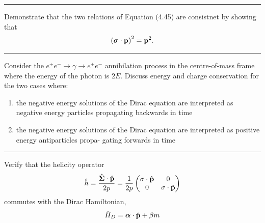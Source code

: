 \noindent\rule{7in}{1.5pt}


\begin{problem}{4.10}
Demonstrate that the two relations of Equation (4.45) are consistnet by showing that
\begin{align*}
    \left( \boldsymbol{\sigma} \cdot \mathbf{p} \right)^2 = \mathbf{p}^2.
\end{align*}
\end{problem}
\begin{solution}

\end{solution}

\noindent\rule{7in}{1.5pt}


\begin{problem}{4.11}
Consider the $e^+e^-\to\gamma\to e^+e^-$ annihilation process in the centre-of-mass frame where the energy of the photon is $2E$.
Discuss energy and charge conservation for the two cases where:
\begin{enumerate}[label=(\alph*)]
    \item the negative energy solutions of the Dirac equation are interpreted as negative energy particles propagating backwards in time
    \item the negative energy solutions of the Dirac equation are interpreted as positive energy antiparticles propa- gating forwards in time
\end{enumerate}
\end{problem}
\begin{solution}

\end{solution}

\noindent\rule{7in}{1.5pt}


\begin{problem}{4.12}
Verify that the helicity operator
\begin{align*}
    \hat{h} = \frac{\hat{\boldsymbol{\Sigma}}\cdot\hat{\mathbf{p}}}{2p} = \frac{1}{2p}
    \begin{pmatrix}
        \boldmath{\sigma}\cdot\hat{\mathbf{p}} & 0 \\
        0 & \boldmath{\sigma}\cdot\hat{\mathbf{p}}
    \end{pmatrix}
\end{align*}
commutes with the Dirac Hamiltonian,
\begin{align*}
    \hat{H}_D = \boldsymbol{\alpha}\cdot\hat{\mathbf{p}} + \beta m
\end{align*}
\end{problem}
\begin{solution}

\end{solution}

